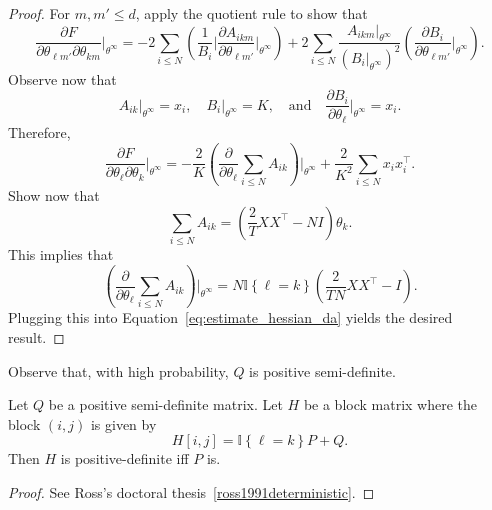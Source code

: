 \begin{proof}
For $m, m' \leq d$, apply the quotient rule to show that
%
\begin{equation}
\frac{\partial F}{\partial \theta_{\ell m'} \partial \theta_{k m}}\Bigr|_{\theta^\infty}
=
-2\sum_{i \leq N}\left(\frac{1}{B_i}\Bigr|\frac{\partial A_{ikm}}{\partial \theta_{\ell m'}}\Bigr|_{\theta^\infty}\right) + 2 \sum_{i \leq N} \frac{A_{ikm}\Bigr|_{\theta^\infty}}{\left(B_i \Bigr|_{\theta^\infty}\right)^2}\left(\frac{\partial B_i}{\partial \theta_{\ell m'}}\Bigr|_{\theta^\infty}\right).
\end{equation}
%
Observe now that
%
\begin{equation}
A_{ik}\Bigr|_{\theta^\infty} = x_i, \quad B_i \Bigr|_{\theta^\infty} = K, \quad \text{and} \quad \frac{\partial B_i}{\partial \theta_\ell}\Bigr|_{\theta^\infty} = x_i.
\end{equation}
%
Therefore,
%
\begin{equation}
\frac{\partial F}{\partial \theta_{\ell} \partial \theta_{k}}\Bigr|_{\theta^\infty}
= - \frac{2}{K}\left(\frac{\partial}{\partial \theta_\ell}\sum_{i \leq N}A_{ik}\right)\Bigr|_{\theta^\infty} + \frac{2}{K^2}\sum_{i \leq N}x_i x_i^\top.
\label{eq:estimate_hessian_da}
\end{equation}
%
Show now that
%
\begin{equation}
\sum_{i \leq N}A_{ik} = \left(\frac{2}{T}XX^\top - NI\right)\theta_k.
\end{equation}
%
This implies that
%
\begin{equation}
\left(\frac{\partial}{\partial \theta_\ell}\sum_{i \leq N}A_{ik}\right)\Bigr|_{\theta^\infty} = N\mathbb{I}\left\{\ell = k\right\}\left(\frac{2}{TN}XX^\top - I\right).
\end{equation}
%
Plugging this into Equation~\ref{eq:estimate_hessian_da} yields the desired result.
\end{proof}

Observe that, with high probability, $Q$ is positive semi-definite.

\begin{lemma}
Let $Q$ be a positive semi-definite matrix. Let $H$ be a block
matrix where the block $(i,j)$ is given by
%
\begin{equation}
H[i,j] = \mathbb{I}\left\{\ell = k\right\} P + Q.
\end{equation}
%
Then $H$ is positive-definite iff $P$ is.
\label{lem:aux_lemma_ross}
\end{lemma}

\begin{proof}
See Ross's doctoral thesis~\ref{ross1991deterministic}.
\end{proof}

